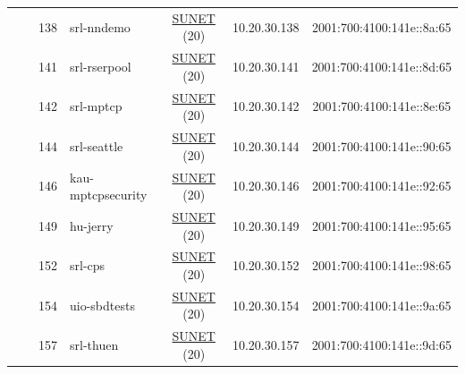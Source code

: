 \begin{small}
\begin{center}
\begin{longtable}{|c|c|c|c|c|c|c|c|}
  &  & \tiny{138} & \multicolumn{1}{|l|}{\tiny{srl-nndemo}} & \multicolumn{2}{|c|}{\tiny{\href{http://www.sunet.se}{SUNET} (20)}} & \tiny{10.20.30.138} & \tiny{2001:700:4100:141e::8a:65} \\* \cline{3-3}\cline{4-4}\cline{5-5}\cline{6-6}\cline{7-7}\cline{8-8}
  &  & \tiny{141} & \multicolumn{1}{|l|}{\tiny{srl-rserpool}} & \multicolumn{2}{|c|}{\tiny{\href{http://www.sunet.se}{SUNET} (20)}} & \tiny{10.20.30.141} & \tiny{2001:700:4100:141e::8d:65} \\* \cline{3-3}\cline{4-4}\cline{5-5}\cline{6-6}\cline{7-7}\cline{8-8}
  &  & \tiny{142} & \multicolumn{1}{|l|}{\tiny{srl-mptcp}} & \multicolumn{2}{|c|}{\tiny{\href{http://www.sunet.se}{SUNET} (20)}} & \tiny{10.20.30.142} & \tiny{2001:700:4100:141e::8e:65} \\* \cline{3-3}\cline{4-4}\cline{5-5}\cline{6-6}\cline{7-7}\cline{8-8}
  &  & \tiny{144} & \multicolumn{1}{|l|}{\tiny{srl-seattle}} & \multicolumn{2}{|c|}{\tiny{\href{http://www.sunet.se}{SUNET} (20)}} & \tiny{10.20.30.144} & \tiny{2001:700:4100:141e::90:65} \\* \cline{3-3}\cline{4-4}\cline{5-5}\cline{6-6}\cline{7-7}\cline{8-8}
  &  & \tiny{146} & \multicolumn{1}{|l|}{\tiny{kau-mptcpsecurity}} & \multicolumn{2}{|c|}{\tiny{\href{http://www.sunet.se}{SUNET} (20)}} & \tiny{10.20.30.146} & \tiny{2001:700:4100:141e::92:65} \\* \cline{3-3}\cline{4-4}\cline{5-5}\cline{6-6}\cline{7-7}\cline{8-8}
  &  & \tiny{149} & \multicolumn{1}{|l|}{\tiny{hu-jerry}} & \multicolumn{2}{|c|}{\tiny{\href{http://www.sunet.se}{SUNET} (20)}} & \tiny{10.20.30.149} & \tiny{2001:700:4100:141e::95:65} \\* \cline{3-3}\cline{4-4}\cline{5-5}\cline{6-6}\cline{7-7}\cline{8-8}
  &  & \tiny{152} & \multicolumn{1}{|l|}{\tiny{srl-cps}} & \multicolumn{2}{|c|}{\tiny{\href{http://www.sunet.se}{SUNET} (20)}} & \tiny{10.20.30.152} & \tiny{2001:700:4100:141e::98:65} \\* \cline{3-3}\cline{4-4}\cline{5-5}\cline{6-6}\cline{7-7}\cline{8-8}
  &  & \tiny{154} & \multicolumn{1}{|l|}{\tiny{uio-sbdtests}} & \multicolumn{2}{|c|}{\tiny{\href{http://www.sunet.se}{SUNET} (20)}} & \tiny{10.20.30.154} & \tiny{2001:700:4100:141e::9a:65} \\* \cline{3-3}\cline{4-4}\cline{5-5}\cline{6-6}\cline{7-7}\cline{8-8}
  &  & \tiny{157} & \multicolumn{1}{|l|}{\tiny{srl-thuen}} & \multicolumn{2}{|c|}{\tiny{\href{http://www.sunet.se}{SUNET} (20)}} & \tiny{10.20.30.157} & \tiny{2001:700:4100:141e::9d:65} \\ \hline

\end{longtable}
\end{center}
\end{small}
